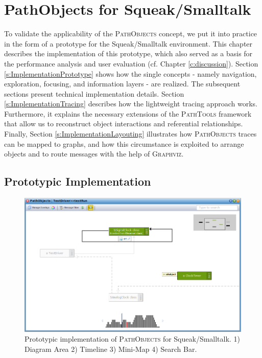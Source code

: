 \chapter{PathObjects for Squeak/Smalltalk}
\label{c:implementation}
To validate the applicability of the \textsc{PathObjects} concept, we put it into practice in the form of a prototype for the Squeak/Smalltalk environment.
This chapter describes the implementation of this prototype, which also served as a basis for the performance analysis and user evaluation (cf. Chapter \ref{c:discussion}).
Section \ref{s:ImplementationPrototype} shows how the single concepts - namely navigation, exploration, focusing, and information layers - are realized.
The subsequent sections present technical implementation details.
Section \ref{s:ImplementationTracing} describes how the lightweight tracing approach works.
Furthermore, it explains the necessary extensions of the \textsc{PathTools} framework that allow us to reconstruct object interactions and referential relationships.
Finally, Section \ref{s:ImplementationLayouting} illustrates how \textsc{PathObjects} traces can be mapped to graphs, and how this circumstance is exploited to arrange objects and to route messages with the help of \textsc{Graphviz}.

\section[Prototypic Implementation]{Prototypic Implementation%
}
\label{s:ImplementationPrototype}

\begin{figure}
	\centering
	\includegraphics[width=1\textwidth]{../images/04-ImplMainWindow}
	\caption[PathObjects for Squeak/Smalltalk]{Prototypic implementation of \textsc{PathObjects} for Squeak/Smalltalk. 1) Diagram Area 2) Timeline 3) Mini-Map 4) Search Bar.}
	\label{fig:ImplementationMainWindow}
\end{figure}

